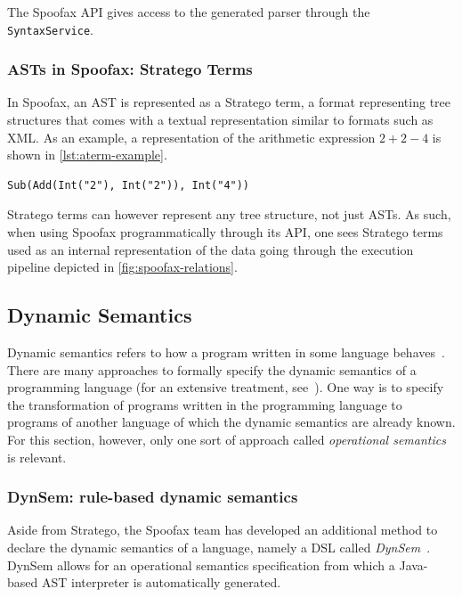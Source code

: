The Spoofax API gives access to the generated parser through the
\texttt{SyntaxService}.

\subsubsection{ASTs in Spoofax: Stratego Terms}
\label{sec:asts-spoof-strat}
In Spoofax, an AST is represented as a Stratego term, a format representing tree
structures that comes with a textual representation similar to formats such as
XML. As an example, a representation of the arithmetic expression $2 + 2 - 4$ is
shown in \cref{lst:aterm-example}.

\begin{lstlisting}[caption={An example AST representation of an arithmetic
expression},language=aterm,label={lst:aterm-example}]
Sub(Add(Int("2"), Int("2")), Int("4"))
\end{lstlisting}

Stratego terms can however represent any tree structure, not just ASTs. As such,
when using Spoofax programmatically through its API, one sees Stratego terms
used as an internal representation of the data going through the execution
pipeline depicted in \cref{fig:spoofax-relations}.

\subsection{Dynamic Semantics}
\label{ssec:dynamic-semantics}
Dynamic semantics refers to how a program written in some language
behaves~\cite{Winskel93}. There are many approaches to formally specify the
dynamic semantics of a programming language (for an extensive treatment,
see~\cite{Winskel93}). One way is to specify the transformation of programs
written in the programming language to programs of another language of which the
dynamic semantics are already known. For this section, however, only one sort of
approach called \emph{operational semantics} is relevant.

\subsubsection{DynSem: rule-based dynamic semantics}
\label{ssec:dynsem}
Aside from Stratego, the Spoofax team has developed an additional
method to declare the dynamic semantics of a language, namely a DSL
called \emph{DynSem}~\cite{VerguNV15}. DynSem allows for an operational
semantics specification from which a Java-based AST interpreter is
automatically generated.

